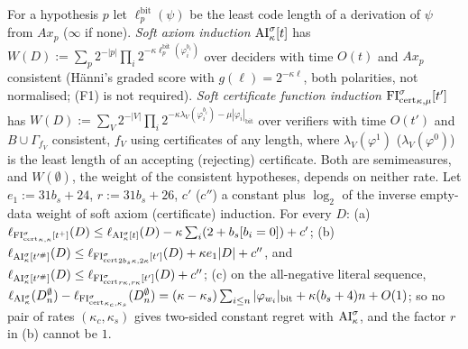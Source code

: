 \begin{proposition}\label{prop:time:soft}
For a hypothesis $p$ let $\ell^{\mathrm{bit}}_p(\psi)$ be the least code length of a derivation of $\psi$ from $Ax_p$ ($\infty$ if none). \emph{Soft axiom induction} $\mathrm{AI}^\sigma_\kappa[t]$ has $W(D):=\sum_p2^{-|p|}\prod_i2^{-\kappa\ell^{\mathrm{bit}}_p(\varphi_i^{b_i})}$ over deciders with time $O(t)$ and $Ax_p$ consistent (H\"anni's graded score with $g(\ell)=2^{-\kappa\ell}$, both polarities, not normalised; (F1) is not required). \emph{Soft certificate function induction} ${\mathrm{FI}_{\mathrm{cert}}^\sigma}_{\kappa,\mu}[t']$ has $W(D):=\sum_V2^{-|V|}\prod_i2^{-\kappa\lambda_V(\varphi_i^{b_i})-\mu|\varphi_i|_{\mathrm{bit}}}$ over verifiers with time $O(t')$ and $B\cup\Gamma_{f_V}$ consistent, $f_V$ using certificates of any length, where $\lambda_V(\varphi^1)$ ($\lambda_V(\varphi^0)$) is the least length of an accepting (rejecting) certificate. Both are semimeasures, and $W(\emptyset)$, the weight of the consistent hypotheses, depends on neither rate. Let $e_1:=31b_s+24$, $r:=31b_s+26$, $c'$ ($c''$) a constant plus $\log_2$ of the inverse empty-data weight of soft axiom (certificate) induction. For every $D$:
(a) $\ell_{{\mathrm{FI}_{\mathrm{cert}}^\sigma}_{\kappa,\kappa}[t^+]}(D)\le\ell_{\mathrm{AI}^\sigma_\kappa[t]}(D)-\kappa\sum_i(2+b_s[b_i=0])+c'$;
(b) $\ell_{\mathrm{AI}^\sigma_\kappa[t'^\#]}(D)\le\ell_{{\mathrm{FI}_{\mathrm{cert}}^\sigma}_{2b_s\kappa,2\kappa}[t']}(D)+\kappa e_1|D|+c''$, and $\ell_{\mathrm{AI}^\sigma_\kappa[t'^\#]}(D)\le\ell_{{\mathrm{FI}_{\mathrm{cert}}^\sigma}_{r\kappa,r\kappa}[t']}(D)+c''$;
(c) on the all-negative literal sequence, $\ell_{\mathrm{AI}^\sigma_\kappa}(D^\emptyset_n)-\ell_{{\mathrm{FI}_{\mathrm{cert}}^\sigma}_{\kappa_c,\kappa_s}}(D^\emptyset_n)=(\kappa-\kappa_s)\sum_{i\le n}|\varphi_{w_i}|_{\mathrm{bit}}+\kappa(b_s+4)n+O(1)$; so no pair of rates $(\kappa_c,\kappa_s)$ gives two-sided constant regret with $\mathrm{AI}^\sigma_\kappa$, and the factor $r$ in (b) cannot be $1$.
\end{proposition}

